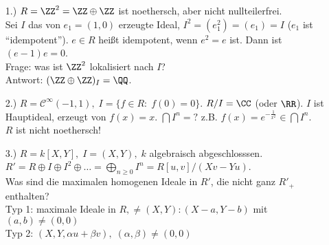 \begin{nnBsp}
  \begin{enumerate}
    \item[1.)] $R = \ZZ^2 = \ZZ \oplus \ZZ$ ist noethersch, aber nicht nullteilerfrei.\\
    Sei $I$ das von $e_1 = (1,0)$ erzeugte Ideal, $I^2 = (e_1^2)= (e_1) = I$ ($e_1$ ist "`idempotent"').
    $e \in R$ heißt idempotent, wenn $e^2 = e$ ist. Dann ist $(e-1)e = 0$.\\
    Frage: was ist $\ZZ^2$ lokalisiert nach $I$?\\
    Antwort: $(\ZZ \oplus \ZZ)_I = \QQ$.
    \item[2.)] $R = \mathcal{C}^{\infty}(-1,1), \; I = \{f \in R: \; f(0)=0\}$. $R/I = \CC$ (oder $\RR$).
    $I$ ist Hauptideal, erzeugt von $f(x) = x$. $\bigcap I^n = ?$ z.B. $f(x) = e^{-\frac{1}{x^2}} \in \bigcap I^n$.\\
    $R$ ist nicht noethersch!
    \item[3.)] $R = k[X,Y], \; I = (X,Y), \; k$ algebraisch abgeschlosssen.\\
    $R' = R \oplus I \oplus I^2 \oplus \dots = \bigoplus_{n \geq 0} I^n = R[u,v]/(X v - Y u)$.\\
    Was sind die maximalen homogenen Ideale in $R'$, die nicht ganz $R'_+$ enthalten?\\
    Typ 1: maximale Ideale in $R, \not= (X,Y): (X-a, Y-b)$ mit $(a,b) \not=(0,0)$\\
    Typ 2: $(X,Y, \alpha u + \beta v), \; (\alpha, \beta) \not= (0,0)$
  \end{enumerate}
\end{nnBsp}
